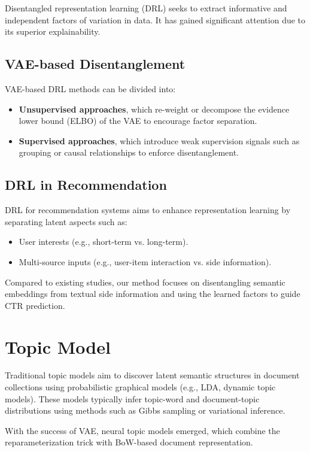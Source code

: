 Disentangled representation learning (DRL) seeks to extract informative and independent factors of variation in data. It has gained significant attention due to its superior explainability.

\subsection{VAE-based Disentanglement}

VAE-based DRL methods can be divided into:
\begin{itemize}
    \item \textbf{Unsupervised approaches}, which re-weight or decompose the evidence lower bound (ELBO) of the VAE to encourage factor separation.
    \item \textbf{Supervised approaches}, which introduce weak supervision signals such as grouping or causal relationships to enforce disentanglement.
\end{itemize}

\subsection{DRL in Recommendation}

DRL for recommendation systems aims to enhance representation learning by separating latent aspects such as:
\begin{itemize}
    \item User interests (e.g., short-term vs. long-term).
    \item Multi-source inputs (e.g., user-item interaction vs. side information).
\end{itemize}

Compared to existing studies, our method focuses on disentangling semantic embeddings from textual side information and using the learned factors to guide CTR prediction.

\section{Topic Model}

Traditional topic models aim to discover latent semantic structures in document collections using probabilistic graphical models (e.g., LDA, dynamic topic models). These models typically infer topic-word and document-topic distributions using methods such as Gibbs sampling or variational inference.

With the success of VAE, neural topic models emerged, which combine the reparameterization trick with BoW-based document representation.

